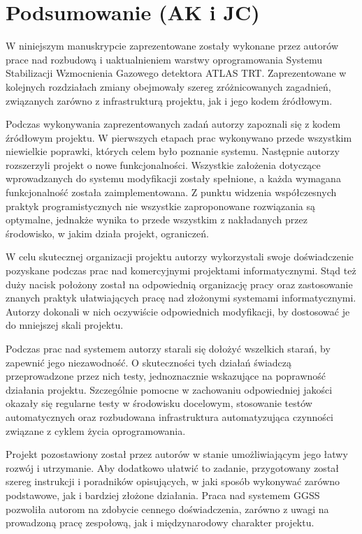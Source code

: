 \chapter{Podsumowanie (AK i JC)}
\label{cha:summary}

W niniejszym manuskrypcie zaprezentowane zostały wykonane przez autorów prace nad rozbudową i uaktualnieniem warstwy oprogramowania Systemu Stabilizacji Wzmocnienia Gazowego detektora ATLAS TRT. Zaprezentowane w kolejnych rozdziałach zmiany obejmowały szereg zróżnicowanych zagadnień, związanych zarówno z infrastrukturą projektu, jak i jego kodem źródłowym. 

Podczas wykonywania zaprezentowanych zadań autorzy zapoznali się z kodem źródłowym projektu. W pierwszych etapach prac wykonywano przede wszystkim niewielkie poprawki, których celem było poznanie systemu. Następnie autorzy rozszerzyli projekt o nowe funkcjonalności. Wszystkie założenia dotyczące wprowadzanych do systemu modyfikacji zostały spełnione, a każda wymagana funkcjonalność została zaimplementowana. Z punktu widzenia współczesnych praktyk programistycznych nie wszystkie zaproponowane rozwiązania są optymalne, jednakże wynika to przede wszystkim z nakładanych przez środowisko, w jakim działa projekt, ograniczeń.

W celu skutecznej organizacji projektu autorzy wykorzystali swoje doświadczenie pozyskane podczas prac nad komercyjnymi projektami informatycznymi. Stąd też duży nacisk położony został na odpowiednią organizację pracy oraz zastosowanie znanych praktyk ułatwiających pracę nad złożonymi systemami informatycznymi. Autorzy dokonali w nich oczywiście odpowiednich modyfikacji, by dostosować je do mniejszej skali projektu.

Podczas prac nad systemem autorzy starali się dołożyć wszelkich starań, by zapewnić jego niezawodność. O skuteczności tych działań świadczą przeprowadzone przez nich testy, jednoznacznie wskazujące na poprawność działania projektu. Szczególnie pomocne w zachowaniu odpowiedniej jakości okazały się regularne testy w środowisku docelowym, stosowanie testów automatycznych oraz rozbudowana infrastruktura automatyzująca czynności związane z cyklem życia oprogramowania.

Projekt pozostawiony został przez autorów w stanie umożliwiającym jego łatwy rozwój i utrzymanie. Aby dodatkowo ułatwić to zadanie, przygotowany został szereg instrukcji i poradników opisujących, w jaki sposób wykonywać zarówno podstawowe, jak i bardziej złożone działania. Praca nad systemem GGSS pozwoliła autorom na zdobycie cennego doświadczenia, zarówno z uwagi na prowadzoną pracę zespołową, jak i międzynarodowy charakter projektu. 
